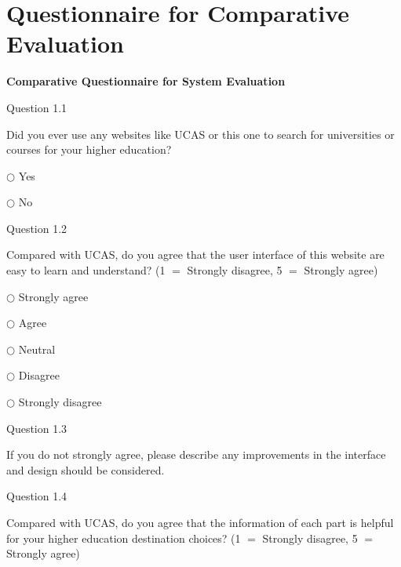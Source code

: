 \chapter{Questionnaire for Comparative Evaluation} \label{Chapter:Appendix C}




\begin{center}
\textbf{Comparative Questionnaire for System Evaluation}
\end{center}

Question 1.1

Did you ever use any websites like UCAS or this one to search for 
universities or courses for your higher education? 

$\bigcirc $ Yes

$\bigcirc $ No

Question 1.2

Compared with UCAS, do you agree that the user interface of this website are 
easy to learn and understand? (1 $=$ Strongly disagree, 5 $=$ Strongly 
agree) 

$\bigcirc $ Strongly agree

$\bigcirc $ Agree

$\bigcirc $ Neutral

$\bigcirc $ Disagree

$\bigcirc $ Strongly disagree

Question 1.3

If you do not strongly agree, please describe any improvements in the 
interface and design should be considered. 

Question 1.4

Compared with UCAS, do you agree that the information of each part is 
helpful for your higher education destination choices? (1 $=$ Strongly 
disagree, 5 $=$ Strongly agree) 

